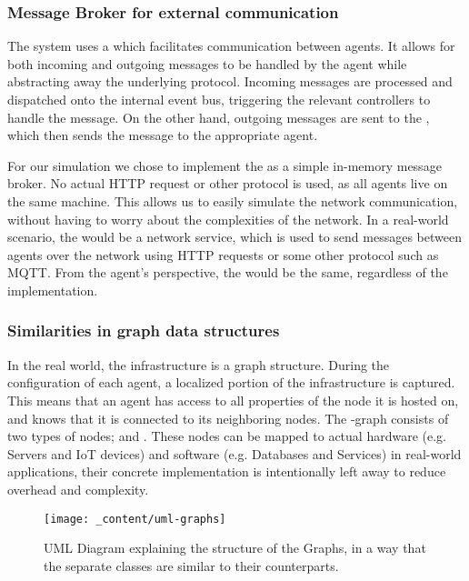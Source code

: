 \subsubsection{Message Broker for external communication}
\label{sssec:message-broker}
The system uses a  which facilitates communication between agents. It allows for both incoming and outgoing messages to be handled by the agent while abstracting away the underlying protocol. Incoming messages are processed and dispatched onto the internal event bus, triggering the relevant controllers to handle the message. On the other hand, outgoing messages are sent to the , which then sends the message to the appropriate agent.

For our simulation we chose to implement the  as a simple in-memory message broker. No actual HTTP request or other protocol is used, as all agents live on the same machine. This allows us to easily simulate the network communication, without having to worry about the complexities of the network. In a real-world scenario, the  would be a network service, which is used to send messages between agents over the network using HTTP requests or some other protocol such as MQTT. From the agent's perspective, the  would be the same, regardless of the implementation.


\subsubsection{Similarities in graph data structures}
\label{sssec:graph-data-structures}
In the real world, the infrastructure is a graph structure. During the configuration of each agent, a localized portion of the infrastructure is captured. This means that an agent has access to all properties of the node it is hosted on, and knows that it is connected to its neighboring nodes. The -graph consists of two types of nodes;  and . These nodes can be mapped to actual hardware (e.g. Servers and IoT devices) and software (e.g. Databases and Services) in real-world applications, their concrete implementation is intentionally left away to reduce overhead and complexity.

\begin{figure}[H]
    \centering
    \texttt{[image: \_content/uml-graphs]}
    \caption{UML Diagram explaining the structure of the Graphs, in a way that the separate classes are similar to their counterparts.}
    \label{fig:uml-graphs}
\end{figure}

